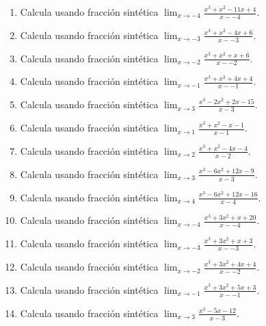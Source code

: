 \documentclass[11pt,a4paper]{article}
\begin{document}
\begin{enumerate}[label=\textbf{E\arabic*.},start=241]

\item Calcula usando fracción sintética $\displaystyle\lim_{x\to -4}\frac{x^3 + x^2 - 11x + 4}{x--4}$. 

\item Calcula usando fracción sintética $\displaystyle\lim_{x\to -3}\frac{x^3 + x^2 - 4x + 6}{x--3}$. 

\item Calcula usando fracción sintética $\displaystyle\lim_{x\to -2}\frac{x^3 + x^2 + x + 6}{x--2}$. 

\item Calcula usando fracción sintética $\displaystyle\lim_{x\to -1}\frac{x^3 + x^2 + 4x + 4}{x--1}$. 

\item Calcula usando fracción sintética $\displaystyle\lim_{x\to 3}\frac{x^3 - 2x^2 + 2x - 15}{x-3}$. 

\item Calcula usando fracción sintética $\displaystyle\lim_{x\to 1}\frac{x^3 + x^2 - x - 1}{x-1}$. 

\item Calcula usando fracción sintética $\displaystyle\lim_{x\to 2}\frac{x^3 + x^2 - 4x - 4}{x-2}$. 

\item Calcula usando fracción sintética $\displaystyle\lim_{x\to 3}\frac{x^3 - 6x^2 + 12x - 9}{x-3}$. 

\item Calcula usando fracción sintética $\displaystyle\lim_{x\to 4}\frac{x^3 - 6x^2 + 12x - 16}{x-4}$. 

\item Calcula usando fracción sintética $\displaystyle\lim_{x\to -4}\frac{x^3 + 3x^2 + x + 20}{x--4}$. 

\item Calcula usando fracción sintética $\displaystyle\lim_{x\to -3}\frac{x^3 + 3x^2 + x + 3}{x--3}$. 

\item Calcula usando fracción sintética $\displaystyle\lim_{x\to -2}\frac{x^3 + 3x^2 + 4x + 4}{x--2}$. 

\item Calcula usando fracción sintética $\displaystyle\lim_{x\to -1}\frac{x^3 + 3x^2 + 5x + 3}{x--1}$. 

\item Calcula usando fracción sintética $\displaystyle\lim_{x\to 3}\frac{x^3 - 5x - 12}{x-3}$. 


\end{enumerate}
\end{document}
